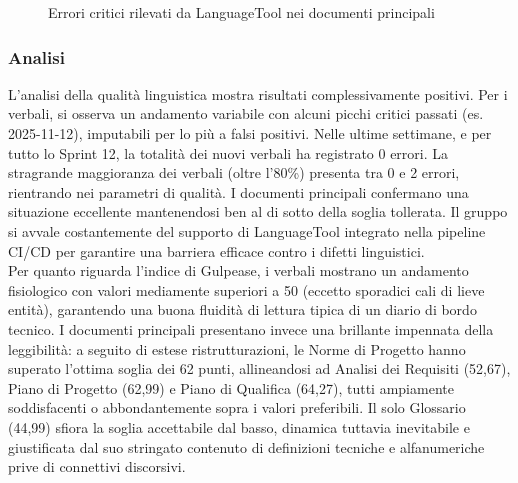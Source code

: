 \documentclass[a4paper,11pt,oneside]{scrartcl}
\begin{document}
\begin{figure}[H]
\centering
{}
\caption{Errori critici rilevati da LanguageTool nei documenti principali}
\label{fig:errori_documenti}
\end{figure}

\subsubsection*{Analisi}

L'analisi della qualità linguistica mostra risultati complessivamente positivi. Per i verbali, si osserva un andamento variabile con alcuni picchi critici passati (es. 2025-11-12), imputabili per lo più a falsi positivi. Nelle ultime settimane, e per tutto lo Sprint 12, la totalità dei nuovi verbali ha registrato 0 errori. La stragrande maggioranza dei verbali (oltre l'80\%) presenta tra 0 e 2 errori, rientrando nei parametri di qualità. I documenti principali confermano una situazione eccellente mantenendosi ben al di sotto della soglia tollerata. Il gruppo si avvale costantemente del supporto di LanguageTool integrato nella pipeline CI/CD per garantire una barriera efficace contro i difetti linguistici.\\
Per quanto riguarda l'indice di Gulpease, i verbali mostrano un andamento fisiologico con valori mediamente superiori a 50 (eccetto sporadici cali di lieve entità), garantendo una buona fluidità di lettura tipica di un diario di bordo tecnico. I documenti principali presentano invece una brillante impennata della leggibilità: a seguito di estese ristrutturazioni, le Norme di Progetto hanno superato l'ottima soglia dei 62 punti, allineandosi ad Analisi dei Requisiti (52,67), Piano di Progetto (62,99) e Piano di Qualifica (64,27), tutti ampiamente soddisfacenti o abbondantemente sopra i valori preferibili. Il solo Glossario (44,99) sfiora la soglia accettabile dal basso, dinamica tuttavia inevitabile e giustificata dal suo stringato contenuto di definizioni tecniche e alfanumeriche prive di connettivi discorsivi.
\end{document}
